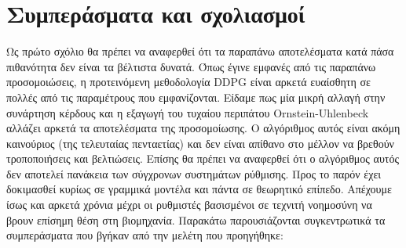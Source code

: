 \documentclass[11pt]{article} %
\numberwithin{equation}{subsection}
\begin{document}
\section{Συμπεράσματα και σχολιασμοί}
Ως πρώτο σχόλιο θα πρέπει να αναφερθεί ότι τα παραπάνω αποτελέσματα κατά πάσα πιθανότητα δεν είναι τα βέλτιστα δυνατά. Όπως έγινε εμφανές από τις παραπάνω προσομοιώσεις, η προτεινόμενη μεθοδολογία DDPG είναι αρκετά ευαίσθητη σε πολλές από τις παραμέτρους που εμφανίζονται. Είδαμε πως μία μικρή αλλαγή στην συνάρτηση κέρδους και η εξαγωγή του τυχαίου περιπάτου Ornstein-Uhlenbeck αλλάζει αρκετά τα αποτελέσματα της προσομοίωσης. Ο αλγόριθμος αυτός είναι ακόμη καινούριος (της τελευταίας πενταετίας) και δεν είναι απίθανο στο μέλλον να βρεθούν τροποποιήσεις και βελτιώσεις. Επίσης θα πρέπει να αναφερθεί ότι ο αλγόριθμος αυτός δεν αποτελεί πανάκεια των σύγχρονων συστημάτων ρύθμισης. Προς το παρόν έχει δοκιμασθεί κυρίως σε γραμμικά μοντέλα και πάντα σε θεωρητικό επίπεδο. Απέχουμε ίσως και αρκετά χρόνια μέχρι οι ρυθμιστές βασισμένοι σε τεχνιτή νοημοσύνη να βρουν επίσημη θέση στη βιομηχανία. Παρακάτω παρουσιάζονται συγκεντρωτικά τα συμπεράσματα που βγήκαν από την μελέτη που προηγήθηκε:\\
\end{document}
